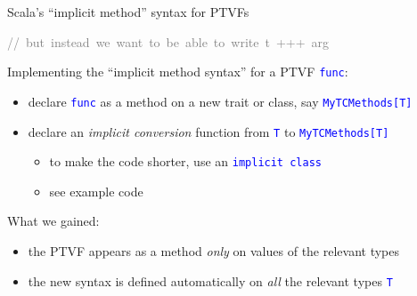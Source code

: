 \documentclass[english]{beamer}
\newenvironment{lyxcode}
   {\par\begin{list}{}{
     \setlength{\rightmargin}{\leftmargin}
     \setlength{\listparindent}{0pt}%
     \raggedright
     \setlength{\itemsep}{0pt}
     \setlength{\parsep}{0pt}
     \normalfont\ttfamily}%
    \def\{{\char`\{}
    \def\}{\char`\}}
    \def\textasciitilde{\char`\~}
    \item[]}
   {\end{list}}
\begin{document}
\begin{frame}{Scala's ``implicit method'' syntax for PTVFs}
\begin{lyxcode}
\textrm{\textcolor{gray}{\footnotesize{}//~but~instead~we~want~to~be~able~to~write~}}\textcolor{gray}{\footnotesize{}t~+++~arg}{\footnotesize \par}
\end{lyxcode}
Implementing the ``implicit method syntax'' for a PTVF \texttt{\textcolor{blue}{\footnotesize{}func}}:
\begin{itemize}
\item declare \texttt{\textcolor{blue}{\footnotesize{}func}} as a method
on a new trait or class, say \texttt{\textcolor{blue}{\footnotesize{}MyTCMethods{[}T{]}}}{\footnotesize \par}
\item declare an \emph{implicit conversion }function from \texttt{\textcolor{blue}{\footnotesize{}T}}
to \texttt{\textcolor{blue}{\footnotesize{}MyTCMethods{[}T{]}}}{\footnotesize \par}
\begin{itemize}
\item to make the code shorter, use an \texttt{\textcolor{blue}{\footnotesize{}implicit
class}}{\footnotesize \par}
\item see example code
\end{itemize}
\end{itemize}
What we gained:
\begin{itemize}
\item the PTVF appears as a method \emph{only} on values of the relevant
types
\item the new syntax is defined automatically on \emph{all} the relevant
types \texttt{\textcolor{blue}{\footnotesize{}T}}{\footnotesize \par}
\end{itemize}
\end{frame}
\end{document}
